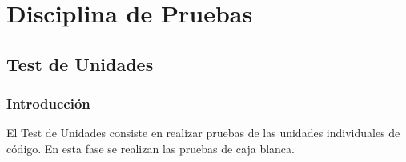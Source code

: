 
\chapter{Disciplina de Pruebas}
\label{chap:pruebas}

\section{Test de Unidades}
	\subsection{Introducción}

		El Test de Unidades consiste en realizar pruebas de las unidades individuales de código. En esta fase se realizan las pruebas de caja blanca. 

